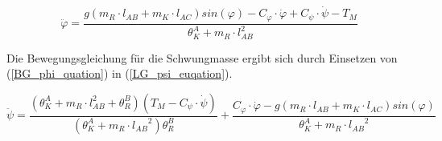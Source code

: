 \begin{equation}
\label{BG_phi_quation}
\ddot{\varphi} = \frac{g(m_R \cdot l_{AB} + m_K \cdot l_{AC})sin(\varphi) - C_{\varphi} \cdot \dot{\varphi} + C_{\psi} \cdot \dot{\psi} - T_M}{{\theta}^A_K + m_R \cdot l_{AB}^2}
\end{equation}

Die Bewegungsgleichung für die Schwungmasse ergibt sich durch Einsetzen von (\ref{BG_phi_quation}) in (\ref{LG_psi_euqation}).

\begin{equation}
\label{BG_psi_equation}
\ddot{\psi} = \frac{({\theta}^A_K + m_R \cdot l_{AB}^2 + {\theta}^B_R)(T_M - C_{\psi} \cdot \dot{\psi})}{({\theta}^A_K + m_R \cdot {l_{AB}}^2){\theta}^B_R} + \frac{C_{\varphi} \cdot \dot{\varphi} - g(m_R \cdot l_{AB} + m_K \cdot l_{AC})sin(\varphi)}{{\theta}^A_K + m_R \cdot {l_{AB}}^2}
\end{equation}